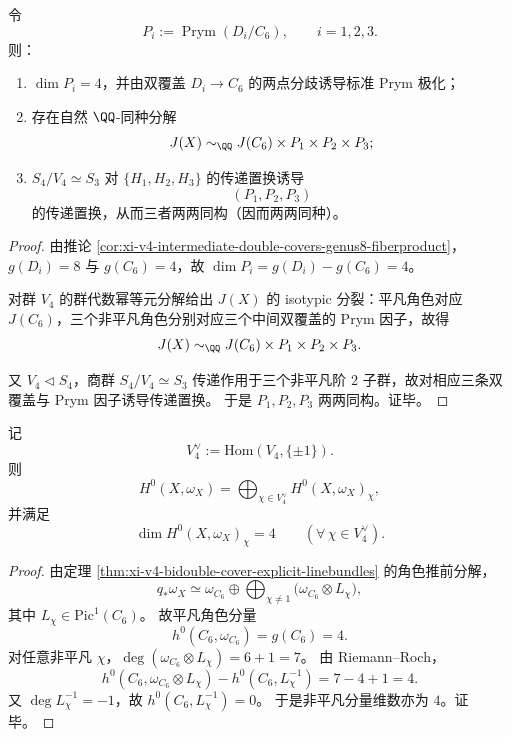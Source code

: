 \begin{theorem}\label{thm:xi-v4-jacobian-prym-triple-decomposition}
令
\[
P_i:=\operatorname{Prym}(D_i/C_6),\qquad i=1,2,3.
\]
则：
\begin{enumerate}
  \item \(\dim P_i=4\)，并由双覆盖 \(D_i\to C_6\) 的两点分歧诱导标准 Prym 极化；
  \item 存在自然 \(\QQ\)-同种分解
  \[
  J(X)\sim_{\QQ}J(C_6)\times P_1\times P_2\times P_3;
  \]
  \item \(S_4/V_4\simeq S_3\) 对 \(\{H_1,H_2,H_3\}\) 的传递置换诱导
  \[
  (P_1,P_2,P_3)
  \]
  的传递置换，从而三者两两同构（因而两两同种）。
\end{enumerate}
\end{theorem}
\begin{proof}
由推论 \ref{cor:xi-v4-intermediate-double-covers-genus8-fiberproduct}，\(g(D_i)=8\) 与 \(g(C_6)=4\)，故
\(
\dim P_i=g(D_i)-g(C_6)=4
\)。
\par
对群 \(V_4\) 的群代数幂等元分解给出 \(J(X)\) 的 isotypic 分裂：平凡角色对应 \(J(C_6)\)，三个非平凡角色分别对应三个中间双覆盖的 Prym 因子，故得
\[
J(X)\sim_{\QQ}J(C_6)\times P_1\times P_2\times P_3.
\]
\par
又 \(V_4\triangleleft S_4\)，商群 \(S_4/V_4\simeq S_3\) 传递作用于三个非平凡阶 \(2\) 子群，故对相应三条双覆盖与 Prym 因子诱导传递置换。
于是 \(P_1,P_2,P_3\) 两两同构。证毕。
\end{proof}

\begin{theorem}\label{thm:xi-v4-character-eigenspace-uniform-dimension-four}
记
\[
V_4^\vee:=\mathrm{Hom}(V_4,\{\pm1\}).
\]
则
\[
H^0(X,\omega_X)=\bigoplus_{\chi\in V_4^\vee}H^0(X,\omega_X)_\chi,
\]
并满足
\[
\dim H^0(X,\omega_X)_\chi=4\qquad(\forall\,\chi\in V_4^\vee).
\]
\end{theorem}
\begin{proof}
由定理 \ref{thm:xi-v4-bidouble-cover-explicit-linebundles} 的角色推前分解，
\[
q_*\omega_X
\simeq
\omega_{C_6}\oplus\bigoplus_{\chi\neq 1}\bigl(\omega_{C_6}\otimes L_\chi\bigr),
\]
其中 \(L_\chi\in\mathrm{Pic}^1(C_6)\)。
故平凡角色分量
\[
h^0(C_6,\omega_{C_6})=g(C_6)=4.
\]
对任意非平凡 \(\chi\)，\(\deg(\omega_{C_6}\otimes L_\chi)=6+1=7\)。
由 Riemann--Roch，
\[
h^0(C_6,\omega_{C_6}\otimes L_\chi)-h^0(C_6,L_\chi^{-1})=7-4+1=4.
\]
又 \(\deg L_\chi^{-1}=-1\)，故 \(h^0(C_6,L_\chi^{-1})=0\)。
于是非平凡分量维数亦为 \(4\)。证毕。
\end{proof}

